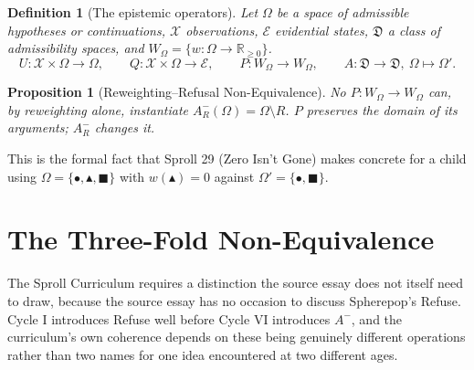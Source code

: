 \documentclass[11pt,twoside]{book}
\newtheorem{proposition}[theorem]{Proposition}
\newtheorem{definition}[theorem]{Definition}
\begin{document}
\begin{definition}[The epistemic operators]
Let $\Omega$ be a space of admissible hypotheses or continuations, $\mathcal{X}$ observations, $\mathcal{E}$ evidential states, $\mathfrak{D}$ a class of admissibility spaces, and $W_\Omega = \{w : \Omega \rightarrow \mathbb{R}_{\geq 0}\}$.
\[
U : \mathcal{X} \times \Omega \rightarrow \Omega, \qquad
Q : \mathcal{X} \times \Omega \rightarrow \mathcal{E}, \qquad
P : W_\Omega \rightarrow W_\Omega, \qquad
A : \mathfrak{D} \rightarrow \mathfrak{D}, \ \Omega \mapsto \Omega'.
\]
\end{definition}

\begin{proposition}[Reweighting--Refusal Non-Equivalence]
No $P : W_\Omega \rightarrow W_\Omega$ can, by reweighting alone, instantiate $A_R^-(\Omega) = \Omega \setminus R$. $P$ preserves the domain of its arguments; $A_R^-$ changes it.
\end{proposition}

This is the formal fact that Sproll 29 (Zero Isn't Gone) makes concrete for a child using $\Omega = \{\bullet, \blacktriangle, \blacksquare\}$ with $w(\blacktriangle) = 0$ against $\Omega' = \{\bullet, \blacksquare\}$.

\chapter{The Three-Fold Non-Equivalence}

The Sproll Curriculum requires a distinction the source essay does not itself need to draw, because the source essay has no occasion to discuss Spherepop's Refuse. Cycle I introduces Refuse well before Cycle VI introduces $A^-$, and the curriculum's own coherence depends on these being genuinely different operations rather than two names for one idea encountered at two different ages.
\end{document}
